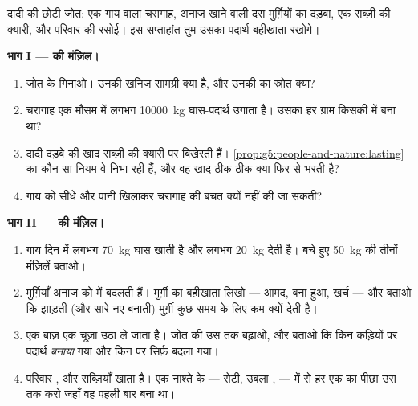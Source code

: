\begin{problem}[{सप्ताहांत समस्या --- एक छोटे खेत की जाँच, खेत से मेज़
तक}]\label{pb:g6:matter-from-food:1}
दादी की छोटी जोत: एक गाय वाला चरागाह, अनाज खाने वाली दस मुर्ग़ियों का
दड़बा, एक सब्ज़ी की क्यारी, और परिवार की रसोई। इस सप्ताहांत तुम उसका
पदार्थ-बहीखाता रखोगे।

\medskip\noindent\textbf{भाग I ---  की मंज़िल।}
\begin{enumerate}
  \item जोत के  गिनाओ। उनकी खनिज सामग्री क्या है, और उनकी
         का स्रोत क्या?
  \item चरागाह एक मौसम में लगभग \qty{10000}{kg} घास-पदार्थ उगाता है।
        उसका हर ग्राम किसकी  में बना था?
  \item दादी दड़बे की खाद सब्ज़ी की क्यारी पर बिखेरती हैं।
        \cref{prop:g5:people-and-nature:lasting} का कौन-सा नियम वे
        निभा रही हैं, और वह खाद ठीक-ठीक क्या फिर से भरती है?
  \item गाय को सीधे  और पानी खिलाकर चरागाह की बचत क्यों नहीं
        की जा सकती?
\end{enumerate}

\medskip\noindent\textbf{भाग II ---  की मंज़िल।}
\begin{enumerate}[resume]
  \item गाय दिन में लगभग \qty{70}{kg} घास खाती है और लगभग
        \qty{20}{kg}  देती है। बचे हुए \qty{50}{kg} की तीनों
        मंज़िलें बताओ।
  \item मुर्ग़ियाँ अनाज को  में बदलती हैं। मुर्ग़ी का बहीखाता
        लिखो --- आमद, बना हुआ, ख़र्च --- और बताओ कि  झाड़ती (और
        सारे  नए बनाती) मुर्ग़ी कुछ समय के लिए कम  क्यों देती
        है।
  \item एक बाज़ एक चूज़ा उठा ले जाता है। जोत की  उस तक
        बढ़ाओ, और बताओ कि किन कड़ियों पर पदार्थ \emph{बनाया} गया और
        किन पर सिर्फ़ बदला गया।
  \item परिवार ,  और सब्ज़ियाँ खाता है। एक नाश्ते के  --- रोटी, उबला ,  --- में से हर एक का पीछा उस
         तक करो जहाँ वह पहली बार बना था।
\end{enumerate}


\end{problem}
